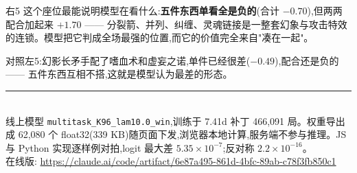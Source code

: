\documentclass[11pt,a4paper]{article}
\begin{document}
右5 这个座位最能说明模型在看什么:\textbf{五件东西单看全是负的}(合计 $-0.70$),但两两配合加起来 \textbf{$+1.70$} —— 分裂箭、并列、纠缠、灵魂链接是一整套幻象与攻击特效的连锁。模型把它判成全场最强的位置,而它的价值完全来自"凑在一起"。

对照左5:幻影长矛手配了嗜血术和虚妄之诺,单件已经很差($-0.49$),配合还是负的 —— 五件东西互相不搭,这就是模型认为最差的形态。

\medskip
\noindent{}

\vfill
\noindent\rule{\textwidth}{0.4pt}\\
{\footnotesize\color{mutedc}
线上模型 \texttt{multitask\_K96\_lam10.0\_win},训练于 7.41d 补丁 466,091 局。权重导出成 62,080 个 float32(339 KB)随页面下发,浏览器本地计算,服务端不参与推理。JS 与 Python 实现逐样例对拍,logit 最大差 $5.35\times10^{-7}$;反对称 $2.2\times10^{-16}$。\\
在线版: \url{https://claude.ai/code/artifact/6e87a495-861d-4bfc-89ab-c78f3fb850c1}}
\end{document}
